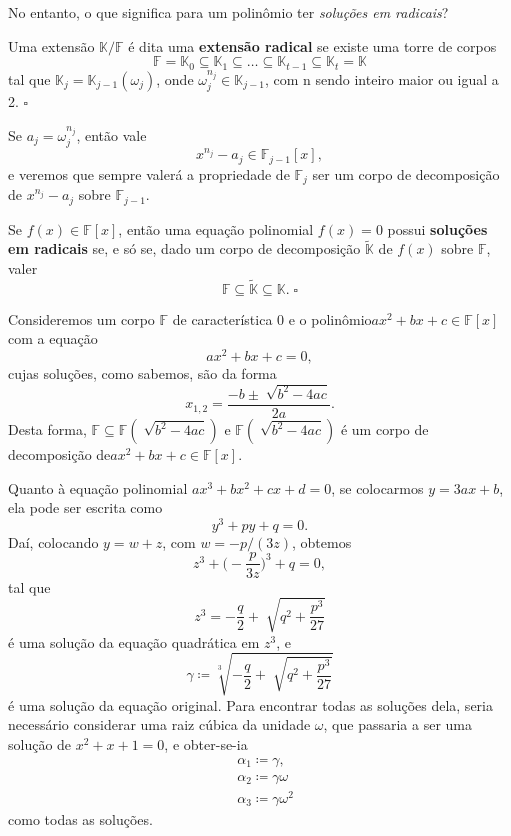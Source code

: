 \documentclass[../algebraIII_notes.tex]{subfiles}
\begin{document}
No entanto, o que significa para um polinômio ter \textit{soluções em radicais}?
\begin{def*}
	Uma extensão \(\mathbb{K}/\mathbb{F}\) é dita uma \textbf{extensão radical} se existe uma torre de corpos
	\[
		\mathbb{F} = \mathbb{K}_{0}\subseteq \mathbb{K}_1 \subseteq \dotsc \subseteq \mathbb{K}_{t-1}\subseteq \mathbb{K}_{t} = \mathbb{K}
	\]
	tal que \(\mathbb{K}_{j}=\mathbb{K}_{j-1}(\omega_{j})\), onde \(\omega_{j}^{n_{j}}\in \mathbb{K}_{j-1}\), com n sendo inteiro maior ou igual a 2. \(\square\)
\end{def*}
Se \(a_{j}=\omega_{j}^{n_{j}}\), então vale
\[
	x^{n_{j}} - a_{j}\in \mathbb{F}_{j-1}[x],
\]
e veremos que sempre valerá a propriedade de \(\mathbb{F}_{j}\) ser um corpo de decomposição de \(x^{n_{j}}-a_{j}\) sobre \(\mathbb{F}_{j-1}\).
\begin{def*}
	Se \(f(x)\in \mathbb{F}[x]\), então uma equação polinomial \(f(x) = 0\) possui \textbf{soluções em radicais} se, e só se, dado um corpo de decomposição \(\tilde{\mathbb{K}}\) de \(f(x)\) sobre \(\mathbb{F}\), valer
	\[
		\mathbb{F}\subseteq \tilde{\mathbb{K}}\subseteq \mathbb{K}. \; \square
	\]
\end{def*}
\begin{example}
	Consideremos um corpo \(\mathbb{F}\) de característica 0 e o polinômio\linebreak \(ax^{2} + bx +c\in \mathbb{F}[x]\) com a equação
	\[
		ax^{2} + bx + c = 0,
	\]
	cujas soluções, como sabemos, são da forma
	\[
		x_{1, 2} = \frac{-b \pm \sqrt[]{b^{2}-4ac}}{2a}.
	\]
	Desta forma, \(\mathbb{F}\subseteq \mathbb{F}(\sqrt[]{b^{2}-4ac})\) e \(\mathbb{F}(\sqrt[]{b^{2}-4ac})\) é um corpo de decomposição de\linebreak \(ax^{2}+bx+c\in \mathbb{F}[x]\).

	Quanto à equação polinomial \(ax^{3} + bx^{2} + cx + d = 0\), se colocarmos \( y = 3ax + b\), ela pode ser escrita como
	\[
		y^{3} + py + q = 0.
	\]
	Daí, colocando \(y = w + z\), com \(w = -p/(3z)\), obtemos
	\[
		z^{3} + \biggl(-\frac{p}{3z}\biggr)^{3} + q= 0,
	\]
	tal que
	\[
		z^{3} = -\frac{q}{2} + \sqrt[]{q^{2} + \frac{p^{3}}{27}}
	\]
	é uma solução da equação quadrática em \(z^{3}\), e
	\[
		\gamma \coloneqq \sqrt[3]{-\frac{q}{2}+\sqrt[]{q^{2}+\frac{p^{3}}{27}}}
	\]
	é uma solução da equação original. Para encontrar todas as soluções dela, seria necessário considerar uma raiz cúbica da unidade \(\omega \), que passaria a ser uma solução de \(x^{2}+x+1 = 0\), e obter-se-ia
	\begin{align*}
		 & \alpha_1 \coloneqq \gamma ,          \\
		 & \alpha_2\coloneqq \gamma \omega      \\
		 & \alpha_3 \coloneqq \gamma \omega^{2}
	\end{align*}
	como todas as soluções.
\end{example}
\end{document}
